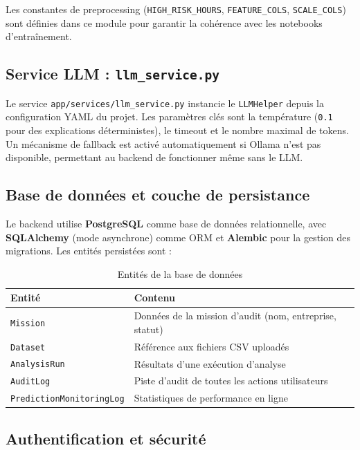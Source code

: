 \documentclass[12pt,a4paper,twoside]{report}
\begin{document}
Les constantes de preprocessing (\texttt{HIGH\_RISK\_HOURS}, \texttt{FEATURE\_COLS}, \texttt{SCALE\_COLS}) sont définies dans ce module pour garantir la cohérence avec les notebooks d'entraînement.

\subsection{Service LLM : \texttt{llm\_service.py}}

Le service \texttt{app/services/llm\_service.py} instancie le \texttt{LLMHelper} depuis la configuration YAML du projet. Les paramètres clés sont la température (\texttt{0.1} pour des explications déterministes), le timeout et le nombre maximal de tokens. Un mécanisme de fallback est activé automatiquement si Ollama n'est pas disponible, permettant au backend de fonctionner même sans le LLM.

\subsection{Base de données et couche de persistance}

Le backend utilise \textbf{PostgreSQL} comme base de données relationnelle, avec \textbf{SQLAlchemy} (mode asynchrone) comme ORM et \textbf{Alembic} pour la gestion des migrations. Les entités persistées sont :

\begin{table}[H]
\centering
\caption{Entités de la base de données}
\label{tab:db_entities}
\begin{tabular}{ll}
\toprule
\textbf{Entité}              & \textbf{Contenu} \\
\midrule
\texttt{Mission}             & Données de la mission d'audit (nom, entreprise, statut) \\
\texttt{Dataset}             & Référence aux fichiers CSV uploadés \\
\texttt{AnalysisRun}         & Résultats d'une exécution d'analyse \\
\texttt{AuditLog}            & Piste d'audit de toutes les actions utilisateurs \\
\texttt{PredictionMonitoringLog} & Statistiques de performance en ligne \\
\bottomrule
\end{tabular}
\end{table}

\subsection{Authentification et sécurité}
\end{document}
